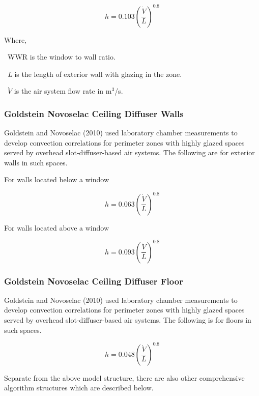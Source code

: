 \begin{equation}
h = 0.103{\left( {\frac{{\dot V}}{L}} \right)^{0.8}}
\end{equation}

Where,

~WWR is the window to wall ratio.

~\emph{L} is the length of exterior wall with glazing in the zone.

~\(\dot V\) is the air system flow rate in m\(^{3}\)/s.

\subsubsection{Goldstein Novoselac Ceiling Diffuser Walls}\label{goldstein-novoselac-ceiling-diffuser-walls}

Goldstein and Novoselac (2010) used laboratory chamber measurements to develop convection correlations for perimeter zones with highly glazed spaces served by overhead slot-diffuser-based air systems. The following are for exterior walls in such spaces.

For walls located below a window

\begin{equation}
h = 0.063{\left( {\frac{{\dot V}}{L}} \right)^{0.8}}
\end{equation}

For walls located above a window

\begin{equation}
h = 0.093{\left( {\frac{{\dot V}}{L}} \right)^{0.8}}
\end{equation}

\subsubsection{Goldstein Novoselac Ceiling Diffuser Floor}\label{goldstein-novoselac-ceiling-diffuser-floor}

Goldstein and Novoselac (2010) used laboratory chamber measurements to develop convection correlations for perimeter zones with highly glazed spaces served by overhead slot-diffuser-based air systems. The following is for floors in such spaces.

\begin{equation}
h = 0.048{\left( {\frac{{\dot V}}{L}} \right)^{0.8}}
\end{equation}

Separate from the above model structure, there are also other comprehensive algorithm structures which are described below.


